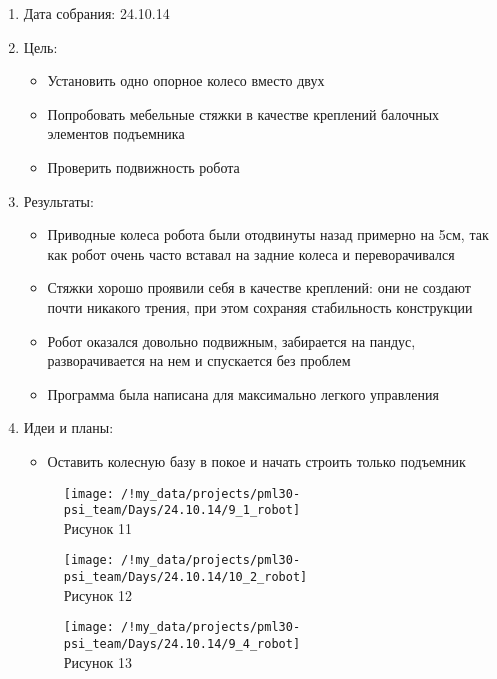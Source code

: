 
	\begin{enumerate}
		\item Дата собрания: 24.10.14
		\item Цель:
		\begin{itemize}
			\item Установить одно опорное колесо вместо двух
			\item Попробовать мебельные стяжки в качестве креплений балочных элементов подъемника
			\item Проверить подвижность робота
		\end{itemize}			
		\item Результаты:
		\begin{itemize}
			\item Приводные колеса робота были отодвинуты назад примерно на 5см, так как робот очень часто вставал на задние колеса и переворачивался
			\item Стяжки хорошо проявили себя в качестве креплений: они не создают почти никакого трения, при этом сохраняя стабильность конструкции
			\item Робот оказался довольно подвижным, забирается на пандус, разворачивается на нем и спускается без проблем
			\item Программа была написана для максимально легкого управления
		\end{itemize}
		\item Идеи и планы:
		\begin{itemize}
			\item Оставить колесную базу в покое и начать строить только подъемник
		\end{itemize}
		\begin{figure} [h]
			\centering
			\begin{minipage}{0.3\linewidth}
				\texttt{[image: /!my\_data/projects/pml30-psi\_team/Days/24.10.14/9\_1\_robot]}\\ Рисунок 11
			\end{minipage}
			\begin{minipage}{0.3\linewidth}
				\texttt{[image: /!my\_data/projects/pml30-psi\_team/Days/24.10.14/10\_2\_robot]}\\ Рисунок 12
			\end{minipage}
			\begin{minipage}{0.3\linewidth}
				\texttt{[image: /!my\_data/projects/pml30-psi\_team/Days/24.10.14/9\_4\_robot]}\\ Рисунок 13
			\end{minipage}
		\end{figure}
	\end{enumerate}
\newpage